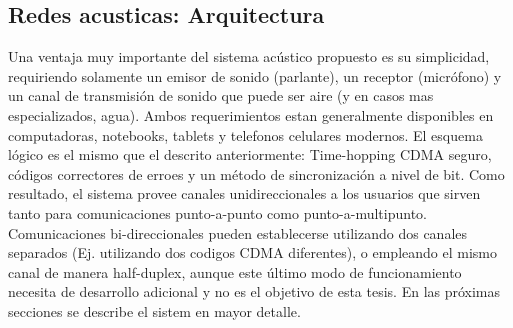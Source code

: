 \subsection{Redes acusticas: Arquitectura}

Una ventaja muy importante del sistema acústico propuesto es su simplicidad, requiriendo solamente un emisor de sonido (parlante), un receptor (micrófono) y un canal de transmisión de sonido que puede ser aire (y en casos mas especializados, agua). Ambos requerimientos estan generalmente disponibles en computadoras, notebooks, tablets y telefonos celulares modernos. 
El esquema lógico es el mismo que el descrito anteriormente: Time-hopping CDMA seguro, códigos correctores de erroes y un método de sincronización a nivel de bit.
Como resultado, el sistema provee canales unidireccionales a los usuarios que sirven tanto para comunicaciones punto-a-punto como punto-a-multipunto. Comunicaciones bi-direccionales pueden establecerse utilizando dos canales separados (Ej. utilizando dos codigos CDMA diferentes), o empleando el mismo canal de manera half-duplex, aunque este último modo de funcionamiento necesita de desarrollo adicional y no es el objetivo de esta tesis.
En las próximas secciones se describe el sistem en mayor detalle.

